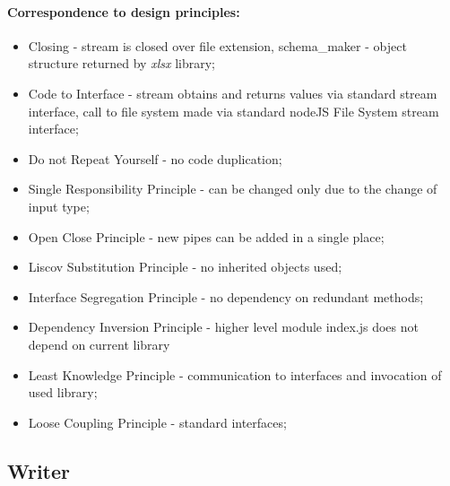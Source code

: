 \paragraph{Correspondence to design principles:}
\begin{itemize}
	\item Closing - stream is closed over file extension, schema\_maker - object structure returned by 	\textit{xlsx} library;
	\item Code to Interface - stream obtains and returns values via standard stream interface, call to file system made via standard nodeJS File System stream interface;
	\item Do not Repeat Yourself - no code duplication;
	\item Single Responsibility Principle - can be changed only due to the change of input type;
	\item Open Close Principle - new pipes can be added in a single place;
	\item Liscov Substitution Principle - no inherited objects used;
	\item Interface Segregation Principle - no dependency on redundant methods;
	\item Dependency Inversion Principle - higher level module index.js does not depend on current library
	\item Least Knowledge Principle - communication to interfaces and invocation of used library;
	\item Loose Coupling Principle - standard interfaces;
\end{itemize}



\subsection{Writer}